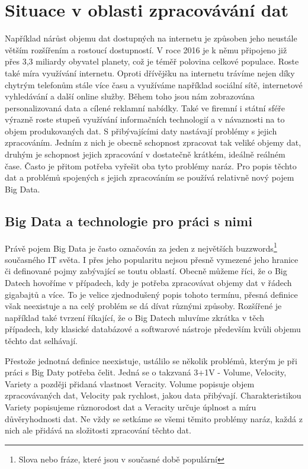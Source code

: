 \documentclass[thesis=B,czech]{FITthesis}[2012/06/26]
\begin{document}
\chapter{Situace v oblasti zpracovávání dat}
	Například nárůst objemu dat dostupných na internetu je způsoben jeho neustále větším rozšířením a rostoucí dostupností. V  roce 2016 je k němu připojeno již přes 3,3 miliardy obyvatel planety\cite{internet-live-stats}, což je téměř polovina celkové populace. Roste také míra využívání internetu. Oproti dřívějšku na internetu trávíme nejen díky chytrým telefonům stále více času a využíváme například sociální sítě, internetové vyhledávání a další online služby. Během toho jsou nám zobrazována personalizovaná data a cílené reklamní nabídky. Také ve firemní i státní sféře výrazně roste stupeň využívání informačních technologií a v návaznosti na to objem produkovaných dat. S přibývajícími daty nastávají problémy s jejich zpracováním. Jedním z nich je obecně schopnost zpracovat tak veliké objemy dat, druhým je schopnost jejich zpracování v dostatečně krátkém, ideálně reálném čase. Často je přitom potřeba vyřešit oba tyto problémy naráz. Pro popis těchto dat a problémů spojených s jejich zpracováním se používá relativně nový pojem Big Data. 

		 
\section{Big Data a technologie pro práci s nimi}
	Právě pojem Big Data je často označován za jeden z největších buzzwords\footnote{Slova nebo fráze, které jsou v současné době populární} současného IT světa. I přes jeho popularitu nejsou přesně vymezené jeho hranice či definované pojmy zabývající se toutu oblastí. Obecně můžeme říci, že o Big Datech hovoříme v případech, kdy je potřeba zpracovávat objemy dat v řádech gigabajtů a více. To je velice zjednodušený popis tohoto termínu, přesná definice však neexistuje a na celý problém se dá dívat různými způsoby. Rozšířené je například také tvrzení říkající, že o Big Datech mluvíme zkrátka v těch případech, kdy klasické databázové a softwarové nástroje především kvůli objemu těchto dat selhávají\cite{webopedia-bigdata}. 

	Přestože jednotná definice neexistuje, ustálilo se několik problémů, kterým je při práci s Big Daty potřeba čelit. Jedná se o takzvaná 3+1V - Volume, Velocity, Variety a později přidaná vlastnost Veracity\cite{dp-customer-inteligence}. Volume popisuje objem zpracovávaných dat, Velocity pak rychlost, jakou data přibývají. Charakteristikou Variety popisujeme různorodost dat a Veracity určuje úplnost a míru důvěryhodnosti dat. Ne vždy se setkáme se všemi těmito problémy naráz, každá z nich ale přidává na složitosti zpracování těchto dat. 
	
\end{document}
